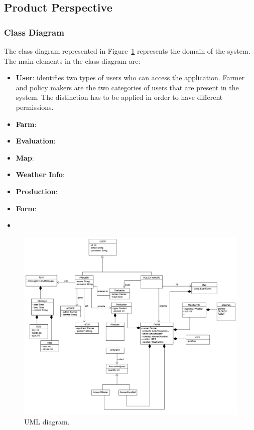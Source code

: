 \subsection{Product Perspective}
\subsubsection{Class Diagram}
The class diagram represented in Figure~\ref{fig:uml} represents the domain of the system. \\
The main elements in the class diagram are:
\begin{itemize}
    \item \textbf{User}: identifies two types of users who can access the application. 
    Farmer and policy makers are the two categories of users that are present in the system. 
    The distinction has to be applied in order to have different permissions.
    \item \textbf{Farm}:
    \item \textbf{Evaluation}:
    \item \textbf{Map}:
    \item \textbf{Weather Info}:
    \item \textbf{Production}:
    \item \textbf{Form}:
    \item 
\end{itemize}
\begin{figure}[H]
    \begin{center}
    \includegraphics[width=1\textwidth]{images/UMLSW2_1.png}
    \caption{UML diagram.}
    \label{fig:uml}
    \end{center}
\end{figure}
\newpage
